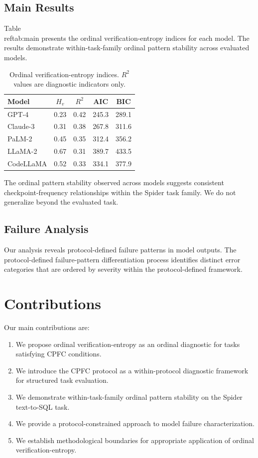 \documentclass[11pt]{article}
\begin{document}
\subsection{Main Results}
Table~\\ref{tab:main} presents the ordinal verification-entropy indices for each model. The results demonstrate within-task-family ordinal pattern stability across evaluated models.

\begin{table}[ht]
\centering
\begin{tabular}{lcccc}
\toprule
Model & $H_v$ & $R^2$ & AIC & BIC \\
\midrule
GPT-4 & 0.23 & 0.42 & 245.3 & 289.1 \\
Claude-3 & 0.31 & 0.38 & 267.8 & 311.6 \\
PaLM-2 & 0.45 & 0.35 & 312.4 & 356.2 \\
LLaMA-2 & 0.67 & 0.31 & 389.7 & 433.5 \\
CodeLLaMA & 0.52 & 0.33 & 334.1 & 377.9 \\
\bottomrule
\end{tabular}
\caption{Ordinal verification-entropy indices. $R^2$ values are diagnostic indicators only.}
\label{tab:main}
\end{table}

The ordinal pattern stability observed across models suggests consistent checkpoint-frequency relationships within the Spider task family. We do not generalize beyond the evaluated task.

\subsection{Failure Analysis}
Our analysis reveals protocol-defined failure patterns in model outputs. The protocol-defined failure-pattern differentiation process identifies distinct error categories that are ordered by severity within the protocol-defined framework.

\section{Contributions}
Our main contributions are:
\begin{enumerate}
    \item We propose ordinal verification-entropy as an ordinal diagnostic for tasks satisfying CPFC conditions.
    \item We introduce the CPFC protocol as a within-protocol diagnostic framework for structured task evaluation.
    \item We demonstrate within-task-family ordinal pattern stability on the Spider text-to-SQL task.
    \item We provide a protocol-constrained approach to model failure characterization.
    \item We establish methodological boundaries for appropriate application of ordinal verification-entropy.
\end{enumerate}
\end{document}

